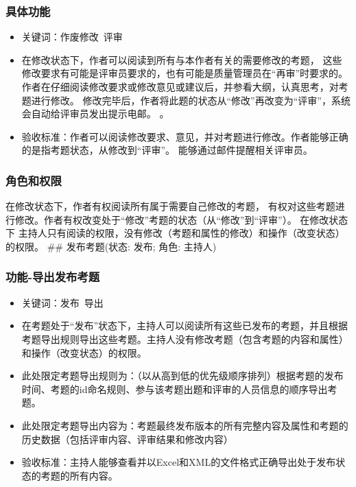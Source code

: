 \documentclass[hyperref, a4paper]{ctexart}
\providecommand{\tightlist}{%
  \setlength{\itemsep}{0pt}\setlength{\parskip}{0pt}}
\begin{document}
\hypertarget{ux5177ux4f53ux529fux80fd}{%
\subsubsection{具体功能}\label{ux5177ux4f53ux529fux80fd}}

\begin{itemize}
\tightlist
\item
  关键词：作废修改~评审
\item
  在修改状态下，作者可以阅读到所有与本作者有关的需要修改的考题，
  这些修改要求有可能是评审员要求的，也有可能是质量管理员在``再审''时要求的。
  作者在仔细阅读修改要求或修改意见或建议后，并参看大纲，认真思考，对考题进行修改。
  修改完毕后，作者将此题的状态从``修改''再改变为``评审''，系统会自动给评审员发出提示电邮。
  。
\item
  验收标准：作者可以阅读修改要求、意见，并对考题进行修改。作者能够正确的是指考题状态，从修改到``评审''。
  能够通过邮件提醒相关评审员。
\end{itemize}

\hypertarget{ux89d2ux8272ux548cux6743ux9650-2}{%
\subsubsection{角色和权限}\label{ux89d2ux8272ux548cux6743ux9650-2}}

在修改状态下，作者有权阅读所有属于需要自己修改的考题，
有权对这些考题进行修改。作者有权改变处于``修改''考题的状态（从``修改''到``评审''）。
在修改状态下
主持人只有阅读的权限，没有修改（考题和属性的修改）和操作（改变状态）的权限。
\#\# 发布考题(状态: 发布; 角色: 主持人)

\hypertarget{ux529fux80fd-ux5bfcux51faux53d1ux5e03ux8003ux9898}{%
\subsubsection{功能-导出发布考题}\label{ux529fux80fd-ux5bfcux51faux53d1ux5e03ux8003ux9898}}

\begin{itemize}
\item
  关键词：发布~导出
\item
  在考题处于``发布''状态下，主持人可以阅读所有这些已发布的考题，并且根据考题导出规则导出这些考题。主持人没有修改考题（包含考题的内容和属性）和操作（改变状态）的权限。
\item
  此处限定考题导出规则为：（以从高到低的优先级顺序排列）根据考题的发布时间、考题的id命名规则、参与该考题出题和评审的人员信息的顺序导出考题。
\item
  此处限定考题导出内容为：考题最终发布版本的所有完整内容及属性和考题的历史数据（包括评审内容、评审结果和修改内容）
\item
  验收标准：主持人能够查看并以Excel和XML的文件格式正确导出处于发布状态的考题的所有内容。
\end{itemize}
\end{document}
